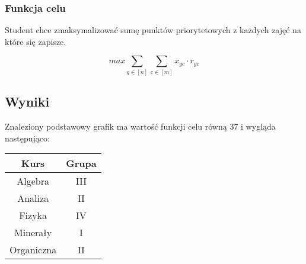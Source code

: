 \documentclass{article}
\theoremstyle{definition}
\theoremstyle{remark}
\theoremstyle{plain}
\theoremstyle{remark}
\theoremstyle{plain}
\begin{document}
\subsubsection{Funkcja celu}
Student chce zmaksymalizować sumę punktów priorytetowych z każdych zajęć na które się zapisze.

\[ max {\sum_{g \in [n]}{\sum_{c \in [m]}{x_{gc}\cdot r_{gc}}}} \]

\subsection{Wyniki}
Znaleziony podstawowy grafik ma wartość funkcji celu równą 37 i wygląda następująco:
\begin{table}[H]
	\centering
	\begin{tabular}{|c|c|} \hline
		Kurs & Grupa \\\hline
        Algebra & III \\\hline
        Analiza & II \\\hline
        Fizyka & IV \\\hline
        Minerały & I \\\hline
        Organiczna & II \\\hline
	\end{tabular}
\end{table}
\end{document}
